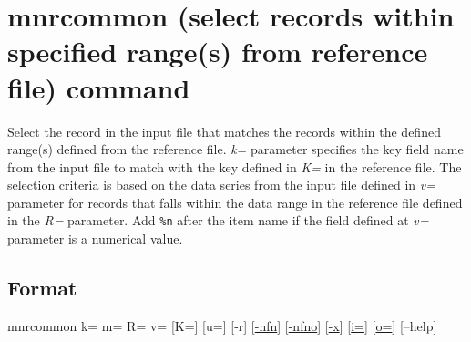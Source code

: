 \documentclass[a4paper]{jarticle}
\begin{document}
\setlength{\baselineskip}{4mm}

\section*{mnrcommon (select records within specified range(s) from reference file) command}
Select the record in the input file that matches the records within the defined range(s) defined from the reference file.
 \emph{k=} parameter specifies the key field name from the input file to match with the key defined in \emph{K=} in the reference file. The selection criteria is based on the data series from the input file defined in \emph{v=} parameter for records that falls within the data range in the reference file defined in the \emph{R= } parameter. 
Add \verb|%n| after the item name if the field defined at \emph{v=} parameter is a numerical value.  

\subsection*{Format}
mnrcommon  k= m= R= v= [K=] [u=] [-r] 
[\href{run:option.pdf}{-nfn}] 
[\href{run:option.pdf}{-nfno}] 
[\href{run:option.pdf}{-x}] 
[\href{run:option.pdf}{i=}] 
[\href{run:option.pdf}{o=}] 
[--help]\\
\end{document}
